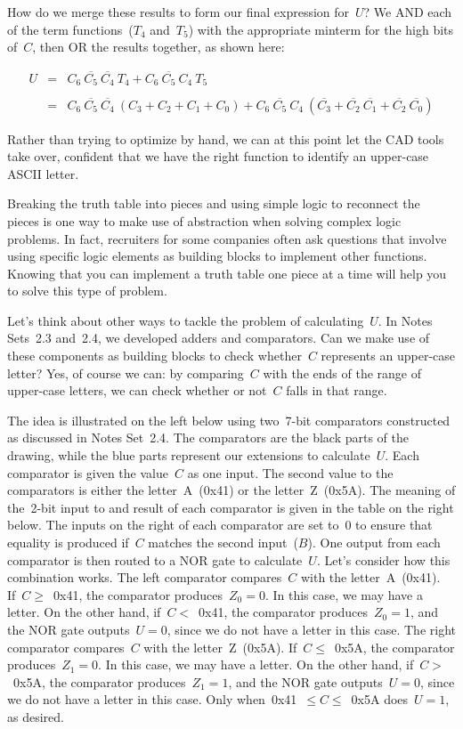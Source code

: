 How do we merge these results to form our final expression for~$U$?
%
We AND each of the term functions~($T_4$ and~$T_5$) with the 
appropriate minterm for the
high bits of~$C$, then OR the results together, as shown here:

\begin{eqnarray*}
U&=&C_6~\overline{C_5}~\overline{C_4}~T_4+C_6~\overline{C_5}~C_4~T_5\\
\\
&=&C_6~\overline{C_5}~\overline{C_4}~(C_3+C_2+C_1+C_0)+
C_6~\overline{C_5}~C_4~(\overline{C_3}+\overline{C_2}~\overline{C_1}+\overline{C_2}~\overline{C_0})
\end{eqnarray*}

Rather than trying to optimize by hand, we can at this point let the CAD
tools take over, confident that we have the right function to identify
an upper-case ASCII letter.

Breaking the truth table into pieces and using simple logic to reconnect
the pieces is one way to make use of abstraction when solving complex
logic problems.  
%
In fact, recruiters for some companies often ask
questions that involve using specific logic elements as building blocks
to implement other functions.  Knowing that you can implement
a truth table one piece at a time will help you to solve this type of
problem.

Let's think about other ways to tackle the problem of calculating~$U$.
In Notes Sets~2.3 and~2.4, we developed adders and comparators.  Can
we make use of these components as building blocks to check whether~$C$ 
represents an
upper-case letter?  Yes, of course we can: by comparing~$C$ with the
ends of the range of upper-case letters, we can check whether or not~$C$
falls in that range.

The idea is illustrated on the left below using two~\mbox{7-bit} comparators
constructed as discussed in Notes Set~2.4.
The comparators are the black parts of the drawing, while the blue parts
represent our extensions to calculate~$U$.  Each comparator is given
the value~$C$ as one input.  The second value to the comparators is 
either the letter~A~(0x41) or the letter~Z~(0x5A).  The meaning of 
the~\mbox{2-bit} input to and result of each comparator is given in the 
table on the right below.  The inputs on the right of each comparator
are set to~0 to ensure that equality is produced if~$C$ matches
the second input~($B$).
%
One output from each comparator is then routed to
a NOR gate to calculate~$U$.  Let's consider how this combination works.
The left comparator compares~$C$ with the letter~A~(0x41).  If~$C\geq$~0x41,
the comparator produces~$Z_0=0$.  In this case, we may have a letter.
On the other hand, if~$C<$~0x41, the comparator produces~$Z_0=1$, and
the NOR gate outputs~$U=0$, since we do not have a letter in this case.
%
The right comparator compares~$C$ with the letter~Z~(0x5A).  If~$C\leq$~0x5A,
the comparator produces~$Z_1=0$.  In this case, we may have a letter.
On the other hand, if~$C>$~0x5A, the comparator produces~$Z_1=1$, and
the NOR gate outputs~$U=0$, since we do not have a letter in this case.
%
Only when~0x41~$\leq{C}\leq$~0x5A does~$U=1$, as desired.\\ 

